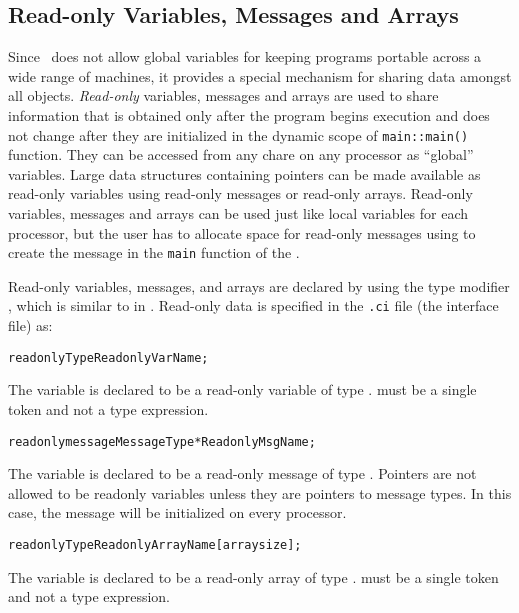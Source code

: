 \subsection{Read-only Variables, Messages and Arrays}

Since \charmpp\ does not allow global variables for keeping programs portable
across a wide range of machines, it provides a special mechanism for sharing
data amongst all objects. {\it Read-only} variables, messages and arrays are
used to share information that is obtained only after the program begins
execution and does not change after they are initialized in the dynamic scope
of {\tt main::main()} function. They can be accessed from any
chare on any processor as ``global'' variables. Large data
structures containing pointers can be made available as read-only variables
using read-only messages or read-only arrays. Read-only variables, messages and
arrays can be used just like local variables for each processor, but the user
has to allocate space for read-only messages using  to create the
message in the {\tt main} function of the . 

Read-only variables, messages, and arrays are declared by using the type
modifier , which is similar to  in \CC. Read-only data
is specified in the {\tt .ci} file (the interface file) as: 

\begin{alltt}
 readonly Type ReadonlyVarName;
\end{alltt}

The variable  is declared to be a read-only variable of
type .  must be a single token and not a type expression.

\begin{alltt}
 readonly message MessageType *ReadonlyMsgName;
\end{alltt}

The variable  is declared to be a read-only message of type
. Pointers are not allowed to be readonly variables unless they
are pointers to message types. In this case, the message will be initialized on
every processor.

\begin{alltt}
 readonly Type ReadonlyArrayName [arraysize];
\end{alltt}

The variable  is declared to be a read-only array of type
.  must be a single token and not a type expression.

